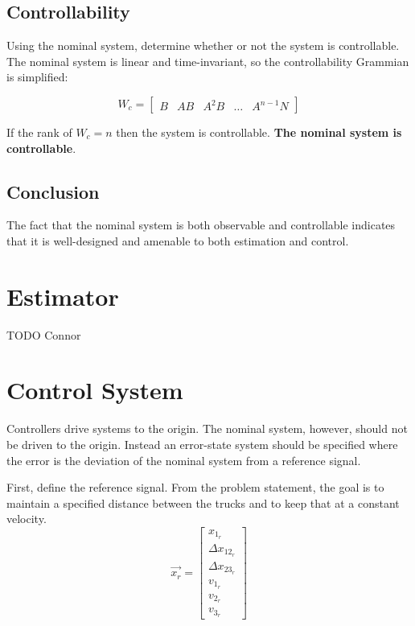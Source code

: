\documentclass[12pt,onecolumn,reqno]{amsart}
\begin{document}
\subsection{Controllability}
Using the nominal system, determine whether or not the system is controllable. The
nominal system is linear and time-invariant, so the controllability Grammian is
simplified:

\begin{equation}
  W_{c} = 
  \begin{bmatrix}
    B & AB & A^2B & \hdots & A^{n-1}N
  \end{bmatrix}
\end{equation}

If the rank of $W_{c} = n$ then the system is controllable. \textbf{The nominal
system is controllable}.

\subsection{Conclusion}
The fact that the nominal system is both observable and controllable indicates
that it is well-designed and amenable to both estimation and control.


\section{Estimator}
TODO Connor

\section{Control System}
Controllers drive systems to the origin. The nominal system, however, should not
be driven to the origin. Instead an error-state system should be specified where
the error is the deviation of the nominal system from a reference signal.

First, define the reference signal. From the problem statement, the goal is to
maintain a specified distance between the trucks and to keep that at a constant
velocity.
\begin{equation}
  \vec{x_{r}} = 
  \begin{bmatrix}
    x_{1_{r}}         \\
    \Delta x_{12_{r}} \\
    \Delta x_{23_{r}} \\
    v_{1_{r}}         \\
    v_{2_{r}}         \\
    v_{3_{r}}
  \end{bmatrix}
\end{equation}
\end{document}
